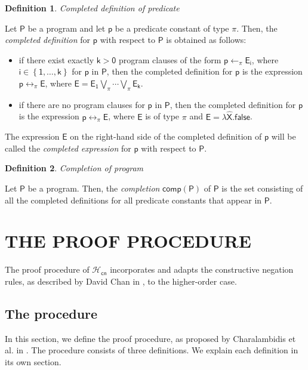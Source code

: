 \documentclass[inscr,ack,preface]{dithesis}
\theoremstyle{definition}
\newtheorem{definition}{Definition}[]
\newcommand{\hcn}{$\mathcal{H}_\mathsf{cn}$}
\newcommand{\msf}[1]{$\mathsf{#1}$}
\begin{document}
\begin{definition}{\emph{Completed definition of predicate}}

Let \msf{P} be a program and let \msf{p} be a predicate constant of type $\pi$. Then, the \emph{completed definition} for \msf{p} with respect to \msf{P} is obtained as follows:
\begin{itemize}
  \item if there exist exactly \msf{k > 0} program clauses of the form \msf{p \leftarrow_{\pi} E_{i}}, where \msf{i \in \left\{ 1, \ldots, k \right\}} for \msf{p} in \msf{P}, then the completed definition for \msf{p} is the expression \msf{p \leftrightarrow_{\pi} E}, where \msf{E = E_1 \bigvee_{\pi} \cdots \bigvee_{\pi} E_k}.
  \item if there are no program clauses for \msf{p} in \msf{P}, then the completed definition for \msf{p} is the expression \msf{p \leftrightarrow_{\pi} E}, where \msf{E} is of type $\pi$ and \msf{E = \lambda \widehat{X}.false}.
\end{itemize}

The expression \msf{E} on the right-hand side of the completed definition of \msf{p} will be called the \emph{completed expression} for \msf{p} with respect to \msf{P}.
\end{definition}

\begin{definition}{\emph{Completion of program}}

Let \msf{P} be a program. Then, the \emph{completion} \msf{comp(P)} of \msf{P} is the set consisting of all the completed definitions for all predicate constants that appear in \msf{P}.
\end{definition}

\chapter{THE PROOF PROCEDURE}
\label{chap:proof}
The proof procedure of \hcn{} incorporates and adapts the constructive negation rules, as described by David Chan in \cite{DBLP:conf/slp/Chan89}, to the higher-order case.

\section{The procedure}
In this section, we define the proof procedure, as proposed by Charalambidis et al. in \cite{DBLP:conf/kr/CharalambidisR14}. The procedure consists of three definitions. We explain each definition in its own section.
\end{document}
